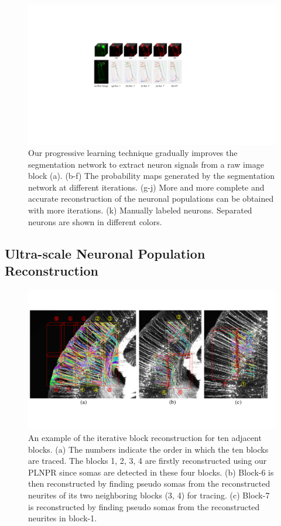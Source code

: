 \begin{figure}[t]
	\centering
	\includegraphics[width=1\columnwidth]{./Illustrations/ngps.pdf}
	\caption{Our progressive learning technique gradually improves the segmentation network to extract neuron signals from a raw image block (a). 
	(b-f) The probability maps generated by the segmentation network at different iterations.
	(g-j) More and more complete and accurate reconstruction of the neuronal populations can be obtained with more iterations. (k) Manually labeled neurons. Separated neurons are shown in different colors.}
	\label{fig:ngps}
\end{figure}
%

\subsection{Ultra-scale Neuronal Population Reconstruction}
\label{sec:UltraNPR}

\begin{figure}[t]
	\centering
	\includegraphics[width=1\columnwidth]{./Illustrations/ultranpr_block_search.pdf}
	\caption{An example of the iterative block reconstruction for ten adjacent blocks. (a) The numbers indicate the order in which the ten blocks are traced. The blocks 1, 2, 3, 4 are firstly reconstructed using our PLNPR since somas are detected in these four blocks. (b) Block-6 is then reconstructed by finding pseudo somas from the reconstructed neurites of its two neighboring blocks (3, 4) for tracing. (c) Block-7 is reconstructed by finding pseudo somas from the reconstructed neurites in block-1.}
	\label{fig:blocksearch}
\end{figure}


